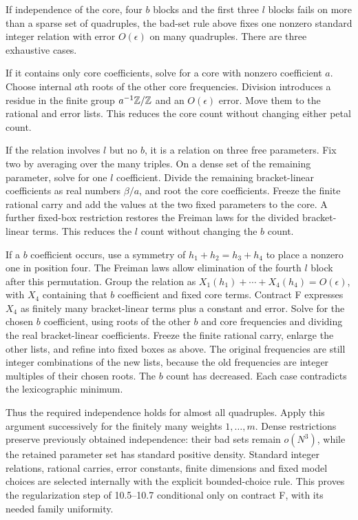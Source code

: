 \documentclass[11pt]{article}
\begin{document}
If independence of the core, four $b$ blocks and the first three $l$ blocks
fails on more than a sparse set of quadruples, the bad-set rule above fixes
one nonzero standard integer relation with error $O(\epsilon)$ on many
quadruples. There are three exhaustive cases.

If it contains only core coefficients, solve for a core with nonzero
coefficient $a$. Choose internal $a$th roots of the other core frequencies.
Division introduces a residue in the finite group $a^{-1}\mathbb Z/\mathbb Z$ and an
$O(\epsilon)$ error. Move them to the rational and error lists. This reduces
the core count without changing either petal count.

If the relation involves $l$ but no $b$, it is a relation on three free
parameters. Fix two by averaging over the many triples. On a dense set of
the remaining parameter, solve for one $l$ coefficient. Divide the remaining
bracket-linear coefficients as real numbers $\beta/a$, and root the core
coefficients. Freeze the finite rational carry and add the values at the
two fixed parameters to the core. A further fixed-box restriction restores
the Freiman laws for the divided bracket-linear terms. This reduces the
$l$ count without changing the $b$ count.

If a $b$ coefficient occurs, use a symmetry of $h_1+h_2=h_3+h_4$ to place
a nonzero one in position four. The Freiman laws allow elimination of the
fourth $l$ block after this permutation. Group the relation as
$X_1(h_1)+\cdots+X_4(h_4)=O(\epsilon)$, with $X_4$ containing that $b$
coefficient and fixed core terms. Contract F expresses $X_4$ as finitely many
bracket-linear terms plus a constant and error. Solve for the chosen $b$
coefficient, using roots of the other $b$ and core frequencies and dividing
the real bracket-linear coefficients. Freeze the finite rational carry,
enlarge the other lists, and refine into fixed boxes as above. The original
frequencies are still integer combinations of the new lists, because the
old frequencies are integer multiples of their chosen roots. The $b$ count
has decreased. Each case contradicts the lexicographic minimum.

Thus the required independence holds for almost all quadruples. Apply this
argument successively for the finitely many weights $1,\ldots,m$. Dense
restrictions preserve previously obtained independence: their bad sets
remain $o(N^3)$, while the retained parameter set has standard positive
density. Standard integer relations, rational carries, error constants,
finite dimensions and fixed model choices are selected internally with
the explicit bounded-choice rule. This proves the regularization step of
10.5--10.7 conditional only on contract F, with its needed family uniformity.
\end{document}
